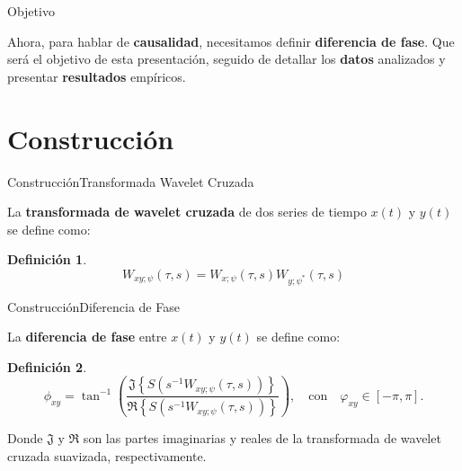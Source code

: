 \documentclass[11pt]{beamer}
\newtheorem{definicion}{Definición}[section]
\begin{document}
	
    \begin{frame}{Objetivo}

	Ahora, para hablar de \textbf{causalidad}, necesitamos definir \textbf{diferencia de fase}. Que será el objetivo de esta presentación, seguido de detallar los \textbf{datos} analizados y presentar \textbf{resultados} empíricos.

    \end{frame}


\section{Construcción}

    \begin{frame}{Construcción}{Transformada Wavelet Cruzada}

    La \textbf{transformada de wavelet cruzada} de dos series de tiempo $x(t)$ y $y(t)$ se define como:

    \begin{definicion}
    \begin{equation}
    W_{xy;\psi}(\tau, s) = W_{x;\psi}(\tau, s)W_{y;\psi^*}(\tau, s)
    \end{equation}
    \end{definicion}

    \end{frame}

    \begin{frame}{Construcción}{Diferencia de Fase}

    La \textbf{diferencia de fase} entre $x(t)$ y $y(t)$ se define como:

    \begin{definicion}
    \begin{equation}
	\phi_{xy}=\tan^{-1} \left(\frac{\mathfrak{J}\left\{S\left(s^{-1}W_{xy;\psi}(\tau,s)\right)\right\}}{\mathfrak{R} \left\{S\left(s^{-1}W_{xy;\psi}(\tau,s)\right)\right\}}\right),\quad \mbox{con}\quad \varphi_{xy}\in[-\pi,\pi].
    \end{equation}
    \end{definicion}

    Donde $\mathfrak{J}$ y $\mathfrak{R}$ son las partes imaginarias y reales de la transformada de wavelet cruzada suavizada, respectivamente.

    \end{frame}
\end{document}

